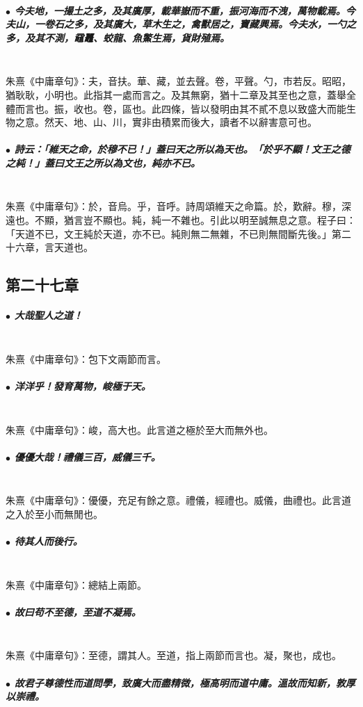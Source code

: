 \documentclass[hyperref, UTF8, 12pt, a4paper]{ctexrep}
\begin{document}
\subparagraph{$\bullet$ 今夫地，一撮土之多，及其廣厚，載華嶽而不重，振河海而不洩，萬物載焉。今夫山，一卷石之多，及其廣大，草木生之，禽獸居之，寶藏興焉。今夫水，一勺之多，及其不測，黿鼉、蛟龍、魚鱉生焉，貨財殖焉。} ~\\

朱熹《中庸章句》：夫，音扶。華、藏，並去聲。卷，平聲。勺，市若反。昭昭，猶耿耿，小明也。此指其一處而言之。及其無窮，猶十二章及其至也之意，蓋舉全體而言也。振，收也。卷，區也。此四條，皆以發明由其不貳不息以致盛大而能生物之意。然天、地、山、川，實非由積累而後大，讀者不以辭害意可也。

\subparagraph{$\bullet$ 詩云：「維天之命，於穆不已！」蓋曰天之所以為天也。「於乎不顯！文王之德之純！」蓋曰文王之所以為文也，純亦不已。} ~\\

朱熹《中庸章句》：於，音烏。乎，音呼。詩周頌維天之命篇。於，歎辭。穆，深遠也。不顯，猶言豈不顯也。純，純一不雜也。引此以明至誠無息之意。程子曰：「天道不已，文王純於天道，亦不已。純則無二無雜，不已則無間斷先後。」第二十六章，言天道也。

\newpage
\subsection{第二十七章}

\subparagraph{$\bullet$ 大哉聖人之道！} ~\\

朱熹《中庸章句》：包下文兩節而言。

\subparagraph{$\bullet$ 洋洋乎！發育萬物，峻極于天。} ~\\

朱熹《中庸章句》：峻，高大也。此言道之極於至大而無外也。

\subparagraph{$\bullet$ 優優大哉！禮儀三百，威儀三千。} ~\\

朱熹《中庸章句》：優優，充足有餘之意。禮儀，經禮也。威儀，曲禮也。此言道之入於至小而無閒也。

\subparagraph{$\bullet$ 待其人而後行。} ~\\

朱熹《中庸章句》：總結上兩節。

\subparagraph{$\bullet$ 故曰苟不至德，至道不凝焉。} ~\\

朱熹《中庸章句》：至德，謂其人。至道，指上兩節而言也。凝，聚也，成也。

\subparagraph{$\bullet$ 故君子尊德性而道問學，致廣大而盡精微，極高明而道中庸。溫故而知新，敦厚以崇禮。} ~\\
\end{document}
